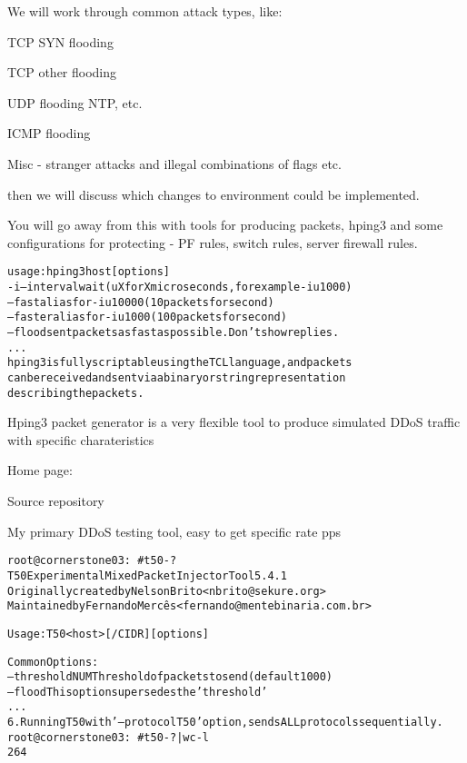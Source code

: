 \documentclass[Screen16to9,17pt]{foils}
\begin{document}

We will work through common attack types, like:

\begin{list2}
\item TCP SYN flooding
\item TCP other flooding
\item UDP flooding NTP, etc.
\item ICMP flooding
\item Misc - stranger attacks and illegal combinations of flags etc.
\end{list2}

then we will discuss which changes to environment could be implemented.

You will go away from this with tools for producing packets, hping3 and some configurations for protecting - PF rules, switch rules, server firewall rules.




\begin{alltt}\footnotesize
usage: hping3 host [options]
  -i  --interval  wait (uX for X microseconds, for example -i u1000)
      --fast      alias for -i u10000 (10 packets for second)
      --faster    alias for -i u1000 (100 packets for second)
      --flood	   sent packets as fast as possible. Don't show replies.
...
hping3 is fully scriptable using the TCL language, and packets
can be received and sent via a binary or string representation
describing the packets.
\end{alltt}

\begin{list2}
\item Hping3 packet generator is a very flexible tool to produce simulated DDoS traffic with specific charateristics
\item Home page: 
\item Source repository 
\end{list2}

\centerline{My primary DDoS testing tool, easy to get specific rate pps}




\begin{alltt}\footnotesize
root@cornerstone03:~# t50 -?
T50 Experimental Mixed Packet Injector Tool 5.4.1
Originally created by Nelson Brito <nbrito@sekure.org>
Maintained by Fernando Mercês <fernando@mentebinaria.com.br>

Usage: T50 <host> [/CIDR] [options]

Common Options:
    --threshold NUM        Threshold of packets to send     (default 1000)
    --flood                This option supersedes the 'threshold'
...
6. Running T50 with '--protocol T50' option, sends ALL protocols sequentially.
root@cornerstone03:~# t50 -? | wc -l
264
\end{alltt}
\end{document}
